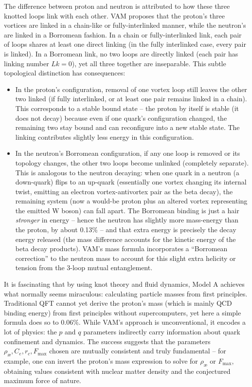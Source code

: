 The difference between proton and neutron is attributed to how these three knotted loops link with each other. VAM proposes that the proton's three vortices are linked in a chain-like or fully-interlinked manner, while the neutron's are linked in a Borromean fashion. In a chain or fully-interlinked link, each pair of loops shares at least one direct linking (in the fully interlinked case, every pair is linked). In a Borromean link, no two loops are directly linked (each pair has linking number $Lk=0$), yet all three together are inseparable. This subtle topological distinction has consequences:

\begin{itemize}
    \item In the proton's configuration, removal of one vortex loop still leaves the other two linked (if fully interlinked, or at least one pair remains linked in a chain). This corresponds to a stable bound state -- the proton by itself is stable (it does not decay) because even if one quark's configuration changed, the remaining two stay bound and can reconfigure into a new stable state. The linking contributes slightly less energy in this configuration.

    \item In the neutron's Borromean configuration, if any one loop is removed or its topology changes, the other two loops become unlinked (completely separate). This is analogous to the neutron decaying: when one quark in a neutron (a down-quark) flips to an up-quark (essentially one vortex changing its internal twist, emitting an electron vortex-antivortex pair as the beta decay), the remaining system (now a would-be proton plus an altered vortex representing the emitted W boson) can fall apart. The Borromean binding is just a hair \textit{stronger} in energy -- hence the neutron has slightly more mass-energy than the proton, by about 0.13\% -- and that extra energy is precisely the decay energy released (the mass difference accounts for the kinetic energy of the beta decay products). VAM's mass formula incorporates a ``Borromean correction'' to the neutron mass to account for this slight extra helicity or tension from the 3-loop mutual entanglement.
\end{itemize}

It is fascinating that by using knot theory and fluid dynamics, Model A achieves what normally seems miraculous: calculating particle masses from first principles. Traditional QFT cannot yet derive the proton's mass (which is mainly QCD binding energy) from first principles without supercomputers, yet here a simple formula does so to 0.06\%. While VAM's approach is unconventional, it encodes a lot of physics: the $p$ and $q$ parameters indirectly carry information about quark confinement and dynamics. The success suggests that the parameters $\rho_{\text{\ae}}, C_e, r_c, F_{\max}$ chosen are mutually consistent and truly fundamental -- for example, one can invert the proton's mass expression to solve for $\rho_{\text{\ae}}$ or $F_{\max}$, obtaining values consistent with nuclear matter density and the conjectured maximum force of nature.

